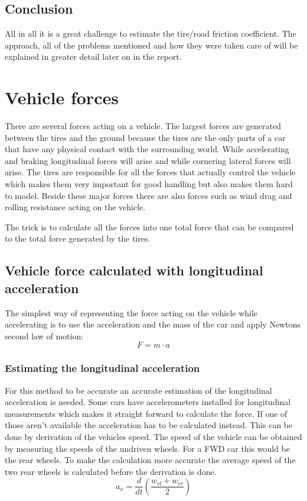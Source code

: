 \subsection{Conclusion}
All in all it is a great challenge to estimate the tire/road friction coefficient.  The approach, all of the problems mentioned and how they were taken care of will be explained in greater detail later on in the report.


\section{Vehicle forces}
There are several forces acting on a vehicle. The largest forces are generated between the tires and the ground because the tires are the only parts of a car that have any physical contact with the surrounding world. While accelerating and braking longitudinal forces will arise and while cornering lateral forces will arise. The tires are responsible for all the forces that actually control the vehicle which makes them very important for good handling but also makes them hard to model. Beside these major forces there are also forces such as wind drag and rolling resistance acting on the vehicle.

The trick is to calculate all the forces into one total force that can be compared to the total force generated by the tires.
\subsection{Vehicle force calculated with longitudinal acceleration}
The simplest way of representing the force acting on the vehicle while accelerating is to use the acceleration and the mass of the car and apply Newtons second law of motion:
\begin{equation}
	F = m \cdot a
\end{equation}
\subsubsection{Estimating the longitudinal acceleration}
For this method to be accurate an accurate estimation of the longitudinal acceleration is needed. Some cars have accelerometers installed for longitudinal measurements which makes it straight forward to calculate the force. If one of those aren't available the acceleration has to be calculated instead. This can be done by derivation of the vehicles speed. The speed of the vehicle can be obtained by measuring the speeds of the undriven wheels. For a FWD car this would be the rear wheels. To make the calculation more accurate the average speed of the two rear wheels is calculated before the derivation is done.
\begin{equation}
a_{x} = \frac{d}{dt}(\frac{w_{rl}+w_{rr}}{2})
\end{equation}

